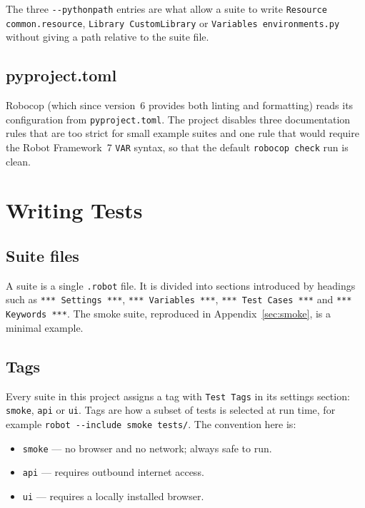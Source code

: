 \documentclass[a4paper,12pt]{article}
\newcommand{\code}[1]{\texttt{#1}}
\begin{document}
The three \code{-{}-pythonpath} entries are what allow a suite to write
\code{Resource common.resource}, \code{Library CustomLibrary} or
\code{Variables environments.py} without giving a path relative to the suite
file.

\subsection{pyproject.toml}

Robocop (which since version~6 provides both linting and formatting) reads its
configuration from \code{pyproject.toml}. The project disables three
documentation rules that are too strict for small example suites and one rule
that would require the Robot Framework~7 \code{VAR} syntax, so that the default
\code{robocop check} run is clean.

\section{Writing Tests}

\subsection{Suite files}

A suite is a single \code{.robot} file. It is divided into sections introduced by
headings such as \code{*** Settings ***}, \code{*** Variables ***},
\code{*** Test Cases ***} and \code{*** Keywords ***}. The smoke suite,
reproduced in Appendix~\ref{sec:smoke}, is a minimal example.

\subsection{Tags}

Every suite in this project assigns a tag with \code{Test Tags} in its settings
section: \code{smoke}, \code{api} or \code{ui}. Tags are how a subset of tests is
selected at run time, for example \code{robot -{}-include smoke tests/}. The
convention here is:

\begin{itemize}
  \item \code{smoke} --- no browser and no network; always safe to run.
  \item \code{api} --- requires outbound internet access.
  \item \code{ui} --- requires a locally installed browser.
\end{itemize}
\end{document}
